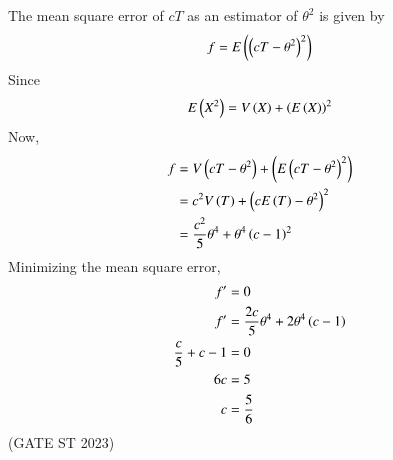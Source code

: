 \documentclass[journal,12pt,onecolumn]{IEEEtran}
\theoremstyle{remark}
\begin{document}
The mean square error of $cT$ as an estimator of $\theta^2$ is given by
\begin{align}
	f = E\left(\left(cT - \theta^2\right)^2\right)
\end{align}
Since
\begin{align}
	E\left(X^2\right) = V\left(X\right) + \left(E\left(X\right)\right)^2
\end{align}
Now,
\begin{align}
	f &= V\left(cT - \theta^2\right) + \left(E\left(cT - \theta^2\right)^2\right)\\
	&= c^2V\left(T\right) + \left(cE\left(T\right) - \theta^2\right)^2\\
	&= \frac{c^2}{5}\theta^4 + \theta^4\left(c-1\right)^2
\end{align}
Minimizing the mean square error,
\begin{align}
	f' &= 0\\
	f' &= \frac{2c}{5}\theta^4 + 2\theta^4\left(c-1\right)\\
	\frac{c}{5} + c - 1 &= 0\\
	6c &= 5\\
	c &= \frac{5}{6}
\end{align}
\hfill{(GATE ST 2023)}
\end{document}
